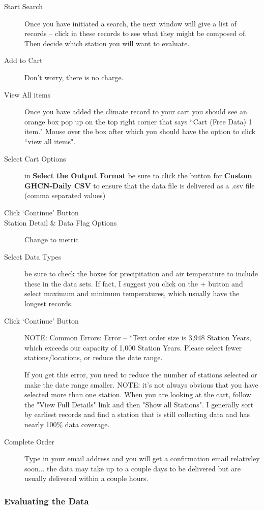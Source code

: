 \documentclass{article}\usepackage[]{graphicx}\usepackage[]{color}
\begin{document}
\begin{description}
  \item[Start Search] Once you have initiated a search, the next window will give a list of records -- click in these records to see what they might be composed of. Then decide which station you will want to evaluate.
  \item[Add to Cart] Don't worry, there is no charge. 
  \item[View All items] Once you have added the climate record to your cart you should see an orange box pop up on the top right corner that says ``Cart (Free Data) 1 item." Mouse over the box after which you should have the option to click ``view all items".
  \item[Select Cart Options] in \textbf{Select the Output Format} be sure to click the button for \textbf{Custom GHCN-Daily CSV} to ensure that the data file is delivered as a .csv file (comma separated values)
  \item[Click `Continue' Button]
  \item[Station Detail \& Data Flag Options] Change to metric
  \item[Select Data Types] be sure to check the boxes for precipitation and air temperature to include these in the data sets. If fact, I suggest you click on the + button and select maximum and minimum temperatures, which usually have the longest records.
  \item[Click `Continue' Button] NOTE: Common Errors:
Error -- *Text order size is 3,948 Station Years, which exceeds our capacity of 1,000 Station Years. Please select fewer stations/locations, or reduce the date range.

If you get this error, you need to reduce the number of stations selected or make the date range smaller. NOTE: it's not always obvious that you have selected more than one station. When you are looking at the cart, follow the "View Full Details" link and then "Show all Stations". I generally sort by earliest records and find a station that is still collecting data and has nearly 100\% data coverage. 
  
  \item[Complete Order] Type in your email address and you will get a confirmation email relativley soon... the data may take up to a couple days to be delivered but are usually delivered within a couple hours.
\end{description}


\subsubsection{Evaluating the Data}
\end{document}
